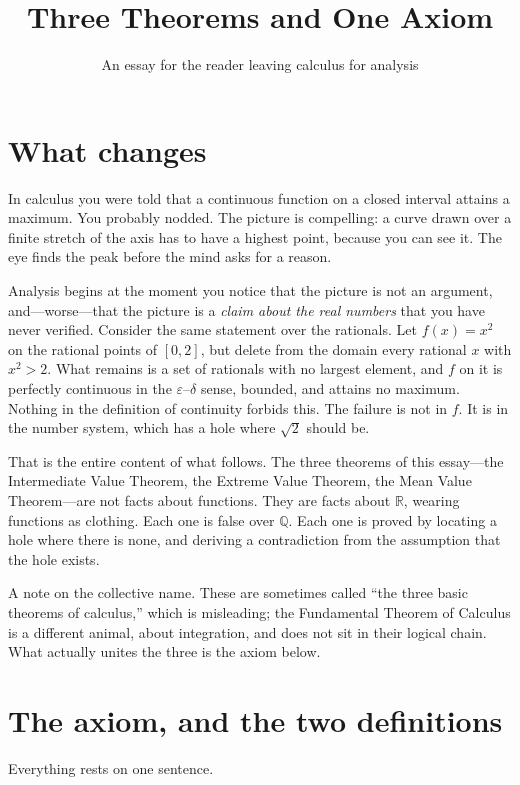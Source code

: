 \documentclass{essay}
\title{Three Theorems and One Axiom}
\author{An essay for the reader leaving calculus for analysis}
\date{}
\begin{document}
\maketitle

\section{What changes}

In calculus you were told that a continuous function on a closed interval attains a maximum. You probably nodded. The picture is compelling: a curve drawn over a finite stretch of the axis has to have a highest point, because you can see it. The eye finds the peak before the mind asks for a reason.

Analysis begins at the moment you notice that the picture is not an argument, and---worse---that the picture is a \emph{claim about the real numbers} that you have never verified. Consider the same statement over the rationals. Let $f(x) = x^{2}$ on the rational points of $[0,2]$, but delete from the domain every rational $x$ with $x^{2} > 2$. What remains is a set of rationals with no largest element, and $f$ on it is perfectly continuous in the $\varepsilon$--$\delta$ sense, bounded, and attains no maximum. Nothing in the definition of continuity forbids this. The failure is not in $f$. It is in the number system, which has a hole where $\sqrt{2}$ should be.

That is the entire content of what follows. The three theorems of this essay---the Intermediate Value Theorem, the Extreme Value Theorem, the Mean Value Theorem---are not facts about functions. They are facts about $\mathbb{R}$, wearing functions as clothing. Each one is false over $\mathbb{Q}$. Each one is proved by locating a hole where there is none, and deriving a contradiction from the assumption that the hole exists.

A note on the collective name. These are sometimes called ``the three basic theorems of calculus,'' which is misleading; the Fundamental Theorem of Calculus is a different animal, about integration, and does not sit in their logical chain. What actually unites the three is the axiom below.

\section{The axiom, and the two definitions}

Everything rests on one sentence.
\end{document}
